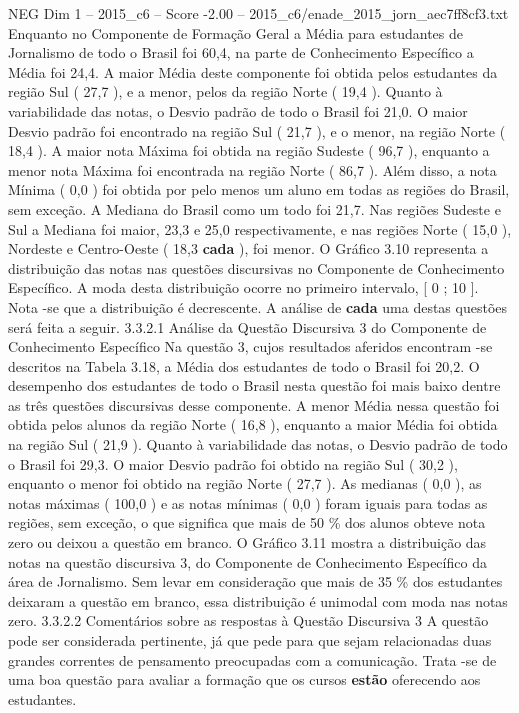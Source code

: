 \begin{textsample}{NEG Dim 1 – 2015\_c6 – Score -2.00 – 2015\_c6/enade\_2015\_jorn\_aec7ff8cf3.txt}
Enquanto no Componente de Formação Geral a Média para estudantes de Jornalismo de todo o Brasil foi 60,4, na parte de Conhecimento Específico a Média foi 24,4.
A maior Média deste componente foi obtida pelos estudantes da região Sul ( 27,7 ), e a menor, pelos da região Norte ( 19,4 ).
Quanto à variabilidade das notas, o Desvio padrão de todo o Brasil foi 21,0.
O maior Desvio padrão foi encontrado na região Sul ( 21,7 ), e o menor, na região Norte ( 18,4 ).
A maior nota Máxima foi obtida na região Sudeste ( 96,7 ), enquanto a menor nota Máxima foi encontrada na região Norte ( 86,7 ).
Além disso, a nota Mínima ( 0,0 ) foi obtida por pelo menos um aluno em todas as regiões do Brasil, sem exceção.
A Mediana do Brasil como um todo foi 21,7.
Nas regiões Sudeste e Sul a Mediana foi maior, 23,3 e 25,0 respectivamente, e nas regiões Norte ( 15,0 ), Nordeste e Centro-Oeste ( 18,3 \textbf{cada} ), foi menor.
O Gráfico 3.10 representa a distribuição das notas nas questões discursivas no Componente de Conhecimento Específico.
A moda desta distribuição ocorre no primeiro intervalo, [ 0 ; 10 ].
Nota -se que a distribuição é decrescente.
A análise de \textbf{cada} uma destas questões será feita a seguir. 3.3.2.1 Análise da Questão Discursiva 3 do Componente de Conhecimento Específico Na questão 3, cujos resultados aferidos encontram -se descritos na Tabela 3.18, a Média dos estudantes de todo o Brasil foi 20,2.
O desempenho dos estudantes de todo o Brasil nesta questão foi mais baixo dentre as três questões discursivas desse componente.
A menor Média nessa questão foi obtida pelos alunos da região Norte ( 16,8 ), enquanto a maior Média foi obtida na região Sul ( 21,9 ).
Quanto à variabilidade das notas, o Desvio padrão de todo o Brasil foi 29,3.
O maior Desvio padrão foi obtido na região Sul ( 30,2 ), enquanto o menor foi obtido na região Norte ( 27,7 ).
As medianas ( 0,0 ), as notas máximas ( 100,0 ) e as notas mínimas ( 0,0 ) foram iguais para todas as regiões, sem exceção, o que significa que mais de 50 \% dos alunos obteve nota zero ou deixou a questão em branco.
O Gráfico 3.11 mostra a distribuição das notas na questão discursiva 3, do Componente de Conhecimento Específico da área de Jornalismo.
Sem levar em consideração que mais de 35 \% dos estudantes deixaram a questão em branco, essa distribuição é unimodal com moda nas notas zero. 3.3.2.2 Comentários sobre as respostas à Questão Discursiva 3 A questão pode ser considerada pertinente, já que pede para que sejam relacionadas duas grandes correntes de pensamento preocupadas com a comunicação.
Trata -se de uma boa questão para avaliar a formação que os cursos \textbf{estão} oferecendo aos estudantes.

\end{textsample}
